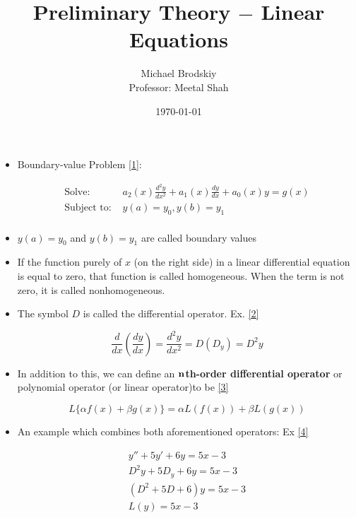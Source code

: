 \documentclass[12pt]{article}
\title{Preliminary Theory $-$ Linear Equations}
\date{\today}
\author{Michael Brodskiy\\ \small Professor: Meetal Shah}
\begin{document}
\maketitle

\begin{itemize}

  \item Boundary-value Problem \eqref{1}:

    \begin{equation}
      \begin{split}
        \text{Solve: }& a_2(x)\frac{d^2y}{dx^2}+a_1(x)\frac{dy}{dx}+a_0(x)y=g(x)\\
        \text{Subject to: }& y(a)=y_0, y(b)=y_1\\
      \end{split}
      \label{1}
    \end{equation}

  \item $y(a)=y_0$ and $y(b)=y_1$ are called boundary values

  \item If the function purely of $x$ (on the right side) in a linear differential equation is equal to zero, that function is called homogeneous. When the term is not zero, it is called nonhomogeneous.

  \item The symbol $D$ is called the differential operator. Ex. \eqref{2}

    \begin{equation}
      \frac{d}{dx}\left( \frac{dy}{dx} \right)=\frac{d^2y}{dx^2}=D(D_y)=D^2y
      \label{2}
    \end{equation}

  \item In addition to this, we can define an \textbf{$\bold{n}$th-order differential operator} or polynomial operator (or linear operator)to be \eqref{3}

    \begin{equation}
      L\{\alpha f(x)+\beta g(x)\}=\alpha L(f(x))+\beta L(g(x))
      \label{3}
    \end{equation}

  \item An example which combines both aforementioned operators: Ex \eqref{4}

    \begin{equation}
      \begin{split}
      y''+5y'+6y=5x-3\\
      D^2y+5D_y+6y=5x-3\\
    (D^2+5D+6)y=5x-3\\
    L(y)=5x-3\\
  \end{split}
      \label{4}
    \end{equation}


\end{itemize}
\end{document}
